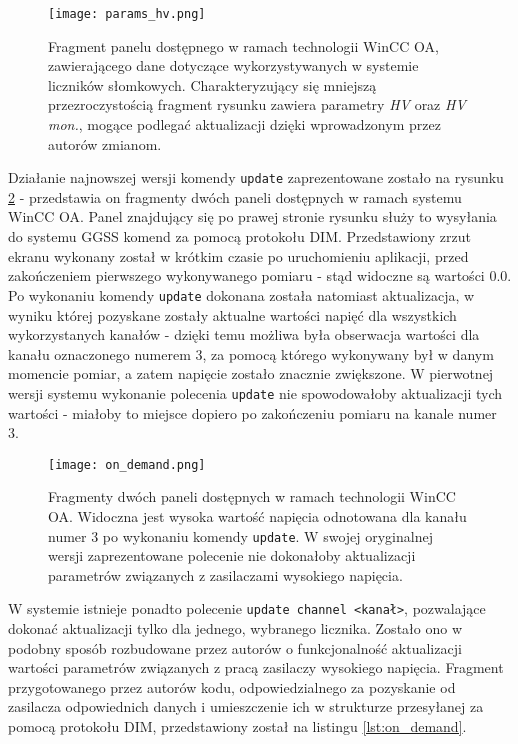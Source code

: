 \begin{figure}[H]
\centering
\texttt{[image: params\_hv.png]}
\caption{Fragment panelu dostępnego w ramach technologii WinCC OA, zawierającego dane dotyczące wykorzystywanych w systemie liczników słomkowych. Charakteryzujący się mniejszą przezroczystością fragment rysunku zawiera parametry \emph{HV} oraz \emph{HV mon.}, mogące podlegać aktualizacji dzięki wprowadzonym przez autorów zmianom.}
\label{fig:hv_params}
\end{figure}

Działanie najnowszej wersji komendy \lstinline{update} zaprezentowane zostało na rysunku \ref{fig:hv_on_demand} - przedstawia on fragmenty dwóch paneli dostępnych w ramach systemu WinCC OA. Panel znajdujący się po prawej stronie rysunku służy to wysyłania do systemu GGSS komend za pomocą protokołu DIM. Przedstawiony zrzut ekranu wykonany został w krótkim czasie po uruchomieniu aplikacji, przed zakończeniem pierwszego wykonywanego pomiaru - stąd widoczne są wartości 0.0. Po wykonaniu komendy \lstinline{update} dokonana została natomiast aktualizacja, w wyniku której pozyskane zostały aktualne wartości napięć dla wszystkich wykorzystanych kanałów - dzięki temu możliwa była obserwacja wartości dla kanału oznaczonego numerem 3, za pomocą którego wykonywany był w danym momencie pomiar, a zatem napięcie zostało znacznie zwiększone. W pierwotnej wersji systemu wykonanie polecenia \lstinline{update} nie spowodowałoby aktualizacji tych wartości - miałoby to miejsce dopiero po zakończeniu pomiaru na kanale numer 3.

\begin{figure}[H]
\centering
\texttt{[image: on\_demand.png]}
\caption{Fragmenty dwóch paneli dostępnych w ramach technologii WinCC OA. Widoczna jest wysoka wartość napięcia odnotowana dla kanału numer 3 po wykonaniu komendy \lstinline{update}. W swojej oryginalnej wersji zaprezentowane polecenie nie dokonałoby aktualizacji parametrów związanych z zasilaczami wysokiego napięcia.}
\label{fig:hv_on_demand}
\end{figure}

W systemie istnieje ponadto polecenie \lstinline{update channel <kanał>}, pozwalające dokonać aktualizacji tylko dla jednego, wybranego licznika. Zostało ono w podobny sposób rozbudowane przez autorów o funkcjonalność aktualizacji wartości parametrów związanych z pracą zasilaczy wysokiego napięcia. Fragment przygotowanego przez autorów kodu, odpowiedzialnego za pozyskanie od zasilacza odpowiednich danych i umieszczenie ich w strukturze przesyłanej za pomocą protokołu DIM, przedstawiony został na listingu \ref{lst:on_demand}.

